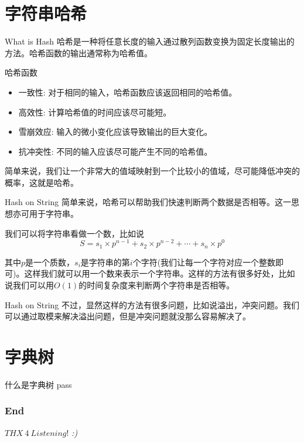 \documentclass{ldr-simple-gray}
\begin{document}
  \section{字符串哈希}
  \begin{frame}{What is Hash}
    哈希是一种将任意长度的输入通过散列函数变换为固定长度输出的方法。哈希函数的输出通常称为哈希值。
    \begin{block}{哈希函数}
      \begin{itemize}
        \item 一致性: 对于相同的输入，哈希函数应该返回相同的哈希值。
        \item 高效性: 计算哈希值的时间应该尽可能短。
        \item 雪崩效应: 输入的微小变化应该导致输出的巨大变化。
        \item 抗冲突性: 不同的输入应该尽可能产生不同的哈希值。
      \end{itemize}
    \end{block}
    简单来说，我们让一个非常大的值域映射到一个比较小的值域，尽可能降低冲突的概率，这就是哈希。
  \end{frame}

  \begin{frame}{Hash on String}
    简单来说，哈希可以帮助我们快速判断两个数据是否相等。这一思想亦可用于字符串。\newline

    我们可以将字符串看做一个数，比如说
    $$S = s_1 \times p^{n-1} + s_2 \times p^{n-2} + \cdots + s_n \times p^0$$

    其中$p$是一个质数，$s_i$是字符串的第$i$个字符(我们让每一个字符对应一个整数即可)。这样我们就可以用一个数来表示一个字符串。这样的方法有很多好处，比如说我们可以用$O(1)$的时间复杂度来判断两个字符串是否相等。
  \end{frame}

  \begin{frame}{Hash on String}
    不过，显然这样的方法有很多问题，比如说溢出，冲突问题。我们可以通过取模来解决溢出问题，但是冲突问题就没那么容易解决了。\newline


  \end{frame}

  \section{字典树}
  \begin{frame}{什么是字典树}
    pass
  \end{frame}

  \begin{frame} %
    \frametitle{End}
    \begin{center}
      \Huge{$THX\ 4\ Listening!$}
      \emph{:)}
    \end{center}
  \end{frame}
\end{document}
